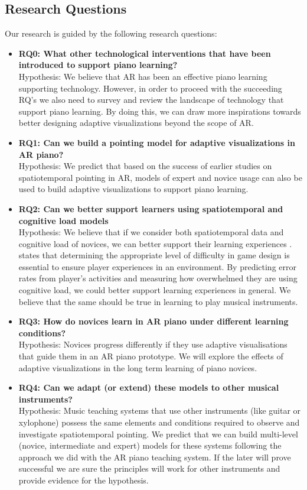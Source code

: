 \documentclass[manuscript,screen]{acmart}
\begin{document}
\subsection{Research Questions}
Our research is guided by the following research questions: 
\begin{itemize}
    \item \textbf{RQ0: What other technological interventions that have been introduced to support piano learning?}\\
    Hypothesis: We believe that AR has been an effective piano learning supporting technology. However, in order to proceed with the succeeding RQ's we also need to survey and review the landscape of technology that support piano learning. By doing this, we can draw more inspirations towards better designing adaptive visualizations beyond the scope of AR. 
    \item \textbf{RQ1: Can we build a pointing model for adaptive visualizations in AR piano?} \\
    Hypothesis: We predict that based on the success of earlier studies on spatiotemporal pointing in AR, models of expert and novice usage can also be used to build adaptive visualizations to support piano learning. 
    \item \textbf{RQ2: Can we better support learners using spatiotemporal and cognitive load models}\\
    Hypothesis: We believe that if we consider both spatiotemporal data and cognitive load of novices, we can better support their learning experiences \cite{rikers2004cognitive}.  \citet{lee2016website} states that determining the appropriate level of difficulty in game design is essential to ensure player experiences in an environment. By predicting error rates from player’s activities and measuring how overwhelmed they are using cognitive load, we could better support learning experiences in general. We believe that the same should be true in learning to play musical instruments.
    \item \textbf{RQ3: How do novices learn in AR piano under different learning conditions?}\\
    Hypothesis: Novices progress differently if they use adaptive visualisations that guide them in an AR piano prototype. We will explore the effects of adaptive visualizations in the long term learning of piano novices. 
    \item \textbf{RQ4: Can we adapt (or extend) these models to other musical instruments?}\\
    Hypothesis: Music teaching systems that use other instruments (like guitar or xylophone) possess the same elements and conditions required to observe and investigate spatiotemporal pointing. We predict that we can build multi-level (novice, intermediate and expert) models for these systems following the approach we did with the AR piano teaching system. If the later will prove successful we are sure the principles will work for other instruments and provide evidence for the hypothesis. 
\end{itemize}
\end{document}
